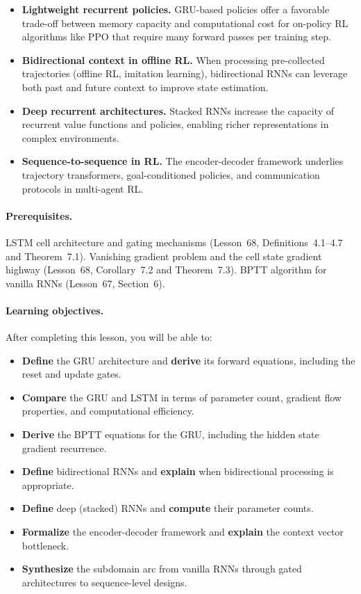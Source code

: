 \documentclass[11pt,a4paper]{article}
\begin{document}
\begin{rlconnection}[title={Why GRU and Sequence Architectures
    Matter for RL/ML}]
\begin{itemize}[nosep]
  \item \textbf{Lightweight recurrent policies.}  GRU-based policies
    offer a favorable trade-off between memory capacity and
    computational cost for on-policy RL algorithms like PPO that
    require many forward passes per training step.
  \item \textbf{Bidirectional context in offline RL.}  When
    processing pre-collected trajectories (offline RL, imitation
    learning), bidirectional RNNs can leverage both past and future
    context to improve state estimation.
  \item \textbf{Deep recurrent architectures.}  Stacked RNNs
    increase the capacity of recurrent value functions and policies,
    enabling richer representations in complex environments.
  \item \textbf{Sequence-to-sequence in RL.}  The encoder-decoder
    framework underlies trajectory transformers, goal-conditioned
    policies, and communication protocols in multi-agent RL.
\end{itemize}
\end{rlconnection}

\paragraph{Prerequisites.}
LSTM cell architecture and gating mechanisms (Lesson~68,
Definitions~4.1--4.7 and Theorem~7.1).  Vanishing gradient problem
and the cell state gradient highway (Lesson~68, Corollary~7.2 and
Theorem~7.3).  BPTT algorithm for vanilla RNNs (Lesson~67,
Section~6).

\paragraph{Learning objectives.}
After completing this lesson, you will be able to:
\begin{itemize}[nosep]
  \item \textbf{Define} the GRU architecture and \textbf{derive}
    its forward equations, including the reset and update gates.
  \item \textbf{Compare} the GRU and LSTM in terms of parameter
    count, gradient flow properties, and computational efficiency.
  \item \textbf{Derive} the BPTT equations for the GRU, including
    the hidden state gradient recurrence.
  \item \textbf{Define} bidirectional RNNs and \textbf{explain}
    when bidirectional processing is appropriate.
  \item \textbf{Define} deep (stacked) RNNs and \textbf{compute}
    their parameter counts.
  \item \textbf{Formalize} the encoder-decoder framework and
    \textbf{explain} the context vector bottleneck.
  \item \textbf{Synthesize} the subdomain arc from vanilla RNNs
    through gated architectures to sequence-level designs.
\end{itemize}
\end{document}
